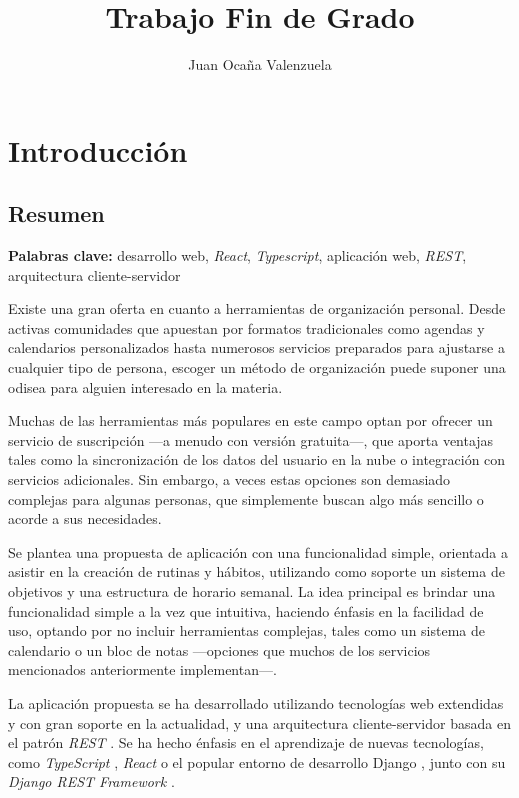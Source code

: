 \documentclass[10pt, a4paper]{aqademic}
\author{Juan Ocaña Valenzuela}
\title{Trabajo Fin de Grado}
\begin{document}
\AqMaketitle[%
	cover    = img/logo.png,
	org      = Grado en Ingeniería Informática,
	subtitle = Aplicación de gestión de rutinas semanales basada en tecnologías web
]
\tableofcontents

\listoffigures

\chapter{Introducción}

\section{Resumen}
\textbf{Palabras clave:} desarrollo web, \textit{React}, \textit{Typescript}, aplicación web, \textit{REST}, arquitectura cliente-servidor

\bigskip

Existe una gran oferta en cuanto a herramientas de organización personal. Desde activas comunidades que apuestan por formatos tradicionales como agendas y calendarios personalizados hasta numerosos servicios preparados para ajustarse a cualquier tipo de persona, escoger un método de organización puede suponer una odisea para alguien interesado en la materia. 

\medskip

Muchas de las herramientas más populares en este campo optan por ofrecer un servicio de suscripción ---a menudo con versión gratuita---, que aporta ventajas tales como la sincronización de los datos del usuario en la nube o integración con servicios adicionales. Sin embargo, a veces estas opciones son demasiado complejas para algunas personas, que simplemente buscan algo más sencillo o acorde a sus necesidades.

\medskip

Se plantea una propuesta de aplicación con una funcionalidad simple, orientada a asistir en la creación de rutinas y hábitos, utilizando como soporte un sistema de objetivos y una estructura de horario semanal. La idea principal es brindar una funcionalidad simple a la vez que intuitiva, haciendo énfasis en la facilidad de uso, optando por no incluir herramientas complejas, tales como un sistema de calendario o un bloc de notas ---opciones que muchos de los servicios mencionados anteriormente implementan---.

\medskip

La aplicación propuesta se ha desarrollado utilizando tecnologías web extendidas y con gran soporte en la actualidad, y una arquitectura cliente-servidor basada en el patrón \textit{REST} \cite{fielding2000architectural}. Se ha hecho énfasis en el aprendizaje de nuevas tecnologías, como \textit{TypeScript} \cite{bierman2014understanding}, \textit{React} \cite{react} o el popular entorno de desarrollo Django \cite{django}, junto con su \textit{Django REST Framework} \cite{drf}.
\end{document}
